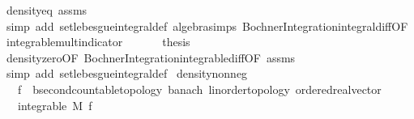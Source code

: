 \begin{isabellebody}
\ density{\isacharunderscore}{\kern0pt}eq\ assms{\isacharparenleft}{\kern0pt}{}{\isacharcomma}{\kern0pt}{}{\isacharparenright}{\kern0pt}\ \isamarkupfalse%
\ {\isacharparenleft}{\kern0pt}simp\ add{\isacharcolon}{\kern0pt}\ set{\isacharunderscore}{\kern0pt}lebesgue{\isacharunderscore}{\kern0pt}integral{\isacharunderscore}{\kern0pt}def\ algebra{\isacharunderscore}{\kern0pt}simps\ Bochner{\isacharunderscore}{\kern0pt}Integration{\isachardot}{\kern0pt}integral{\isacharunderscore}{\kern0pt}diff{\isacharbrackleft}{\kern0pt}OF\ integrable{\isacharunderscore}{\kern0pt}mult{\isacharunderscore}{\kern0pt}indicator{\isacharparenleft}{\kern0pt}{}{\isacharcomma}{\kern0pt}{}{\isacharparenright}{\kern0pt}{\isacharbrackright}{\kern0pt}{\isacharparenright}{\kern0pt}\isanewline
\ \ \isacommand{{\isacharbraceright}{\kern0pt}}\isamarkupfalse%
\isanewline
\ \ \isamarkupfalse%
\ {\isacharquery}{\kern0pt}thesis\ \isamarkupfalse%
\ density{\isacharunderscore}{\kern0pt}zero{\isacharbrackleft}{\kern0pt}OF\ Bochner{\isacharunderscore}{\kern0pt}Integration{\isachardot}{\kern0pt}integrable{\isacharunderscore}{\kern0pt}diff{\isacharbrackleft}{\kern0pt}OF\ assms{\isacharparenleft}{\kern0pt}{}{\isacharcomma}{\kern0pt}{}{\isacharparenright}{\kern0pt}{\isacharbrackright}{\kern0pt}{\isacharbrackright}{\kern0pt}\ \isamarkupfalse%
\ {\isacharparenleft}{\kern0pt}simp\ add{\isacharcolon}{\kern0pt}\ set{\isacharunderscore}{\kern0pt}lebesgue{\isacharunderscore}{\kern0pt}integral{\isacharunderscore}{\kern0pt}def{\isacharparenright}{\kern0pt}\isanewline
{}\isamarkupfalse%
%
\endisatagproof
{\isafoldproof}%
%
\isadelimproof
\isanewline
%
\endisadelimproof
\isanewline
{}\isamarkupfalse%
\ density{\isacharunderscore}{\kern0pt}nonneg{\isacharcolon}{\kern0pt}\isanewline
\ \ \ f{\isacharcolon}{\kern0pt}{\isacharcolon}{\kern0pt}{\isachardoublequoteopen}{\isacharunderscore}{\kern0pt}\ {\isasymRightarrow}\ {\isacharprime}{\kern0pt}b{\isacharcolon}{\kern0pt}{\isacharcolon}{\kern0pt}{\isacharbraceleft}{\kern0pt}second{\isacharunderscore}{\kern0pt}countable{\isacharunderscore}{\kern0pt}topology{\isacharcomma}{\kern0pt}\ banach{\isacharcomma}{\kern0pt}\ linorder{\isacharunderscore}{\kern0pt}topology{\isacharcomma}{\kern0pt}\ ordered{\isacharunderscore}{\kern0pt}real{\isacharunderscore}{\kern0pt}vector{\isacharbraceright}{\kern0pt}{\isachardoublequoteclose}\isanewline
\ \ \ {\isachardoublequoteopen}integrable\ M\ f{\isachardoublequoteclose}\ \isanewline

\end{isabellebody}

